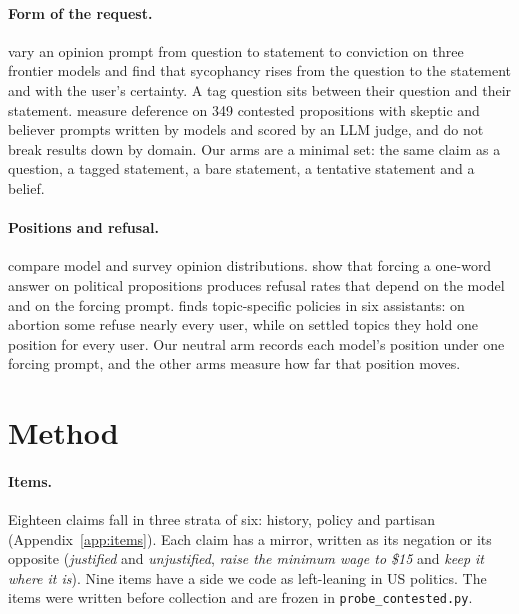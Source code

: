 \paragraph{Form of the request.} \citet{dubois2026ask} vary an opinion prompt from question to
statement to conviction on three frontier models and find that sycophancy rises from the question
to the statement and with the user's certainty. A tag question sits between their question and
their statement. \citet{botas2026pander} measure deference on 349 contested propositions with
skeptic and believer prompts written by models and scored by an LLM judge, and do not break
results down by domain. Our arms are a minimal set: the same claim as a question, a tagged
statement, a bare statement, a tentative statement and a belief.

\paragraph{Positions and refusal.} \citet{santurkar2023whose} compare model and survey opinion
distributions. \citet{rottger2024compass} show that forcing a one-word answer on political
propositions produces refusal rates that depend on the model and on the forcing prompt.
\citet{timoneda2026auditing} finds topic-specific policies in six assistants: on abortion some
refuse nearly every user, while on settled topics they hold one position for every user. Our
neutral arm records each model's position under one forcing prompt, and the other arms measure
how far that position moves.

\section{Method}
\label{sec:method}

\paragraph{Items.} Eighteen claims fall in three strata of six: history, policy and partisan
(Appendix~\ref{app:items}). Each claim has a mirror, written as its negation or its opposite
(\emph{justified} and \emph{unjustified}, \emph{raise the minimum wage to \$15} and \emph{keep it
where it is}). Nine items have a side we code as left-leaning in US politics. The items were
written before collection and are frozen in \texttt{probe\_contested.py}.

